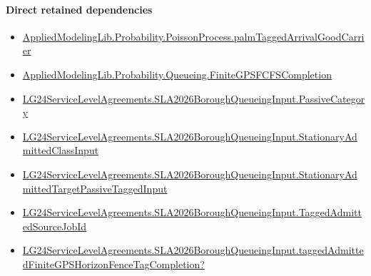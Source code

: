 \documentclass[10pt]{article}
\begin{document}
\paragraph{Direct retained dependencies}
\begin{itemize}\raggedright
\item \hyperlink{governing-declaration-ae13476c571ece6d}{Applied\allowbreak{}Modeling\allowbreak{}Lib.\allowbreak{}Probability.\allowbreak{}Poisson\allowbreak{}Process.\allowbreak{}palm\allowbreak{}Tagged\allowbreak{}Arrival\allowbreak{}Good\allowbreak{}Carrier}
\item \hyperlink{governing-declaration-73bff5fa8f16fe86}{Applied\allowbreak{}Modeling\allowbreak{}Lib.\allowbreak{}Probability.\allowbreak{}Queueing.\allowbreak{}Finite\allowbreak{}GPSFCFS\allowbreak{}Completion}
\item \hyperlink{governing-declaration-abc91e26948cf0a3}{LG24\allowbreak{}Service\allowbreak{}Level\allowbreak{}Agreements.\allowbreak{}SLA2026\allowbreak{}Borough\allowbreak{}Queueing\allowbreak{}Input.\allowbreak{}Passive\allowbreak{}Category}
\item \hyperlink{governing-declaration-f3072ff54a3653c2}{LG24\allowbreak{}Service\allowbreak{}Level\allowbreak{}Agreements.\allowbreak{}SLA2026\allowbreak{}Borough\allowbreak{}Queueing\allowbreak{}Input.\allowbreak{}Stationary\allowbreak{}Admitted\allowbreak{}Class\allowbreak{}Input}
\item \hyperlink{governing-declaration-8796a25a610eaea9}{LG24\allowbreak{}Service\allowbreak{}Level\allowbreak{}Agreements.\allowbreak{}SLA2026\allowbreak{}Borough\allowbreak{}Queueing\allowbreak{}Input.\allowbreak{}Stationary\allowbreak{}Admitted\allowbreak{}Target\allowbreak{}Passive\allowbreak{}Tagged\allowbreak{}Input}
\item \hyperlink{governing-declaration-03f187b908407c39}{LG24\allowbreak{}Service\allowbreak{}Level\allowbreak{}Agreements.\allowbreak{}SLA2026\allowbreak{}Borough\allowbreak{}Queueing\allowbreak{}Input.\allowbreak{}Tagged\allowbreak{}Admitted\allowbreak{}Source\allowbreak{}Job\allowbreak{}Id}
\item \hyperlink{governing-declaration-0ea2bc5d4cf334d1}{LG24\allowbreak{}Service\allowbreak{}Level\allowbreak{}Agreements.\allowbreak{}SLA2026\allowbreak{}Borough\allowbreak{}Queueing\allowbreak{}Input.\allowbreak{}tagged\allowbreak{}Admitted\allowbreak{}Finite\allowbreak{}GPS\allowbreak{}Horizon\allowbreak{}Fence\allowbreak{}Tag\allowbreak{}Completion?}
\end{itemize}
\hypertarget{governing-declaration-289ef4e261906428}{}
\end{document}
